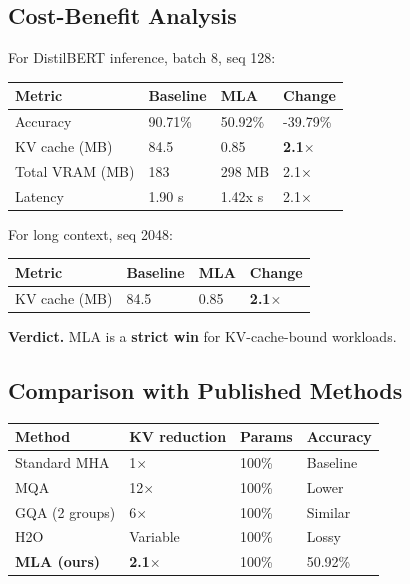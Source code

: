 \subsection{Cost-Benefit Analysis}

For DistilBERT inference, batch 8, seq 128:

\begin{table}[H]
\centering
\small
\begin{tabular}{llll}
\toprule
\textbf{Metric} & \textbf{Baseline} & \textbf{MLA} & \textbf{Change} \\
\midrule
Accuracy & 90.71\% & 50.92\% & -39.79\% \\
KV cache (MB) & 84.5 & 0.85 & \textbf{2.1$\times$} \\
Total VRAM (MB) & 183 & 298 MB & 2.1$\times$ \\
Latency & 1.90 s & 1.42x s & 2.1$\times$ \\
\bottomrule
\end{tabular}
\end{table}

For long context, seq 2048:

\begin{table}[H]
\centering
\small
\begin{tabular}{llll}
\toprule
\textbf{Metric} & \textbf{Baseline} & \textbf{MLA} & \textbf{Change} \\
\midrule
KV cache (MB) & 84.5 & 0.85 & \textbf{2.1$\times$} \\
\bottomrule
\end{tabular}
\end{table}

\textbf{Verdict.} MLA is a \textbf{strict win} for KV-cache-bound workloads.

\subsection{Comparison with Published Methods}

\begin{table}[H]
\centering
\small
\begin{tabular}{llll}
\toprule
\textbf{Method} & \textbf{KV reduction} & \textbf{Params} & \textbf{Accuracy} \\
\midrule
Standard MHA & 1$\times$ & 100\% & Baseline \\
MQA & 12$\times$ & 100\% & Lower \\
GQA (2 groups) & 6$\times$ & 100\% & Similar \\
H2O & Variable & 100\% & Lossy \\
\textbf{MLA (ours)} & \textbf{2.1$\times$} & 100\% & 50.92\% \\
\bottomrule
\end{tabular}
\end{table}


